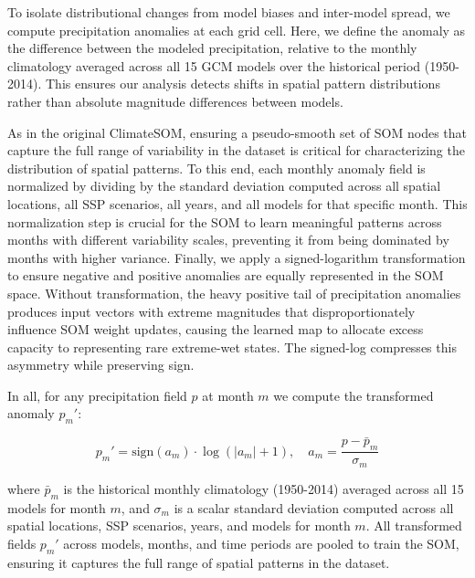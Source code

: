 To isolate distributional changes from model biases and inter-model spread, we compute precipitation anomalies at each grid cell.
%
Here, we define the anomaly as the difference between the modeled precipitation, relative to the monthly climatology averaged across all 15 GCM models over the historical period (1950-2014).
%
This ensures our analysis detects shifts in spatial pattern distributions rather than absolute magnitude differences between models.

As in the original ClimateSOM, ensuring a pseudo-smooth set of SOM nodes that capture the full range of variability in the dataset is critical for characterizing the distribution of spatial patterns.
%
To this end, each monthly anomaly field is normalized by dividing by the standard deviation computed across all spatial locations, all SSP scenarios, all years, and all models for that specific month.
%
This normalization step is crucial for the SOM to learn meaningful patterns across months with different variability scales, preventing it from being dominated by months with higher variance.
%
Finally, we apply a signed-logarithm transformation to ensure negative and positive anomalies are equally represented in the SOM space.
%
Without transformation, the heavy positive tail of precipitation anomalies produces input vectors with extreme magnitudes that disproportionately influence SOM weight updates, causing the learned map to allocate excess capacity to representing rare extreme-wet states.
%
The signed-log compresses this asymmetry while preserving sign.

In all, for any precipitation field $p$ at month $m$ we compute the transformed anomaly $p_m'$:
\begin{linenomath*}
\begin{equation*}
    p_m' = \text{sign}(a_m) \cdot \log(|a_m| + 1), \quad a_m = \frac{p - \bar{p}_m}{\sigma_m}
\end{equation*}
\end{linenomath*}
where $\bar{p}_m$ is the historical monthly climatology (1950-2014) averaged across all 15 models for month $m$, and $\sigma_m$ is a scalar standard deviation computed across all spatial locations, SSP scenarios, years, and models for month $m$.
%
All transformed fields $p_m'$ across models, months, and time periods are pooled to train the SOM, ensuring it captures the full range of spatial patterns in the dataset.

